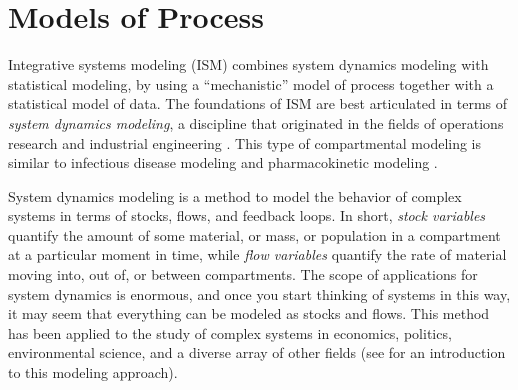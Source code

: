 \chapter{Models of Process}
\label{theory-system_dynamics}

Integrative systems modeling (ISM) combines system dynamics modeling
with statistical modeling, by using a ``mechanistic'' model of process
together with a statistical model of data.  The foundations of ISM are
best articulated in terms of \emph{system dynamics modeling}, a
discipline that originated in the fields of operations research and
industrial engineering \cite{Forrester 1961. Industrial
  dynamics. Waltham, MA: Pegasus Communications} \cite{Forrester
  1969. Urban Dynamics. Pegasus Communications} \cite{Forrester
  1971. World Dynamics. Wright-Allen Press} \cite{Forrester
  1971. World Dynamics. Wright-Allen Press}
\cite{Meadows_Thinking_2008}.  This type of compartmental modeling is
similar to infectious disease modeling \cite{andersen and may -
  infectiuos disease in humans} \cite{keeling and rohani - Modeling
  Infectious Diseases in Humans and Animals} \cite{An Introduction to
  Infectious Disease Modelling - Vynnycky and White}
\cite{Mathematical Epidemiology of Infectious Diseases: Model
  Building, Analysis and Interpretation Diekmann Heesterbeek} and
pharmacokinetic modeling \cite{Compartmental Analysis in Biology and
  Medicine 3rd Edition - John A. Jacquez}
\cite{Jacquez_Modeling_1999}.

System dynamics modeling is a method to model the behavior of complex
systems in terms of stocks, flows, and feedback loops.  In short,
\emph{stock variables} quantify the amount of some material, or mass,
or population in a compartment at a particular moment in time, while
\emph{flow variables} quantify the rate of material moving into, out
of, or between compartments. The scope of applications for system
dynamics is enormous, and once you start thinking of systems in this
way, it may seem that everything can be modeled as stocks and
flows. This method has been applied to the study of complex systems in
economics, politics, environmental science, and a diverse array of
other fields (see
\cite{Meadows_Thinking_2008,Jacquez_Modeling_1999,Harte_Consider_1988}
for an introduction to this modeling approach).

